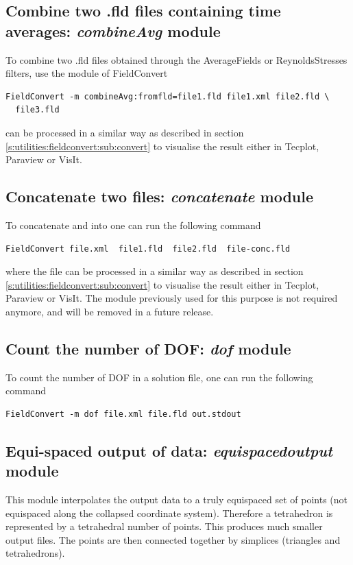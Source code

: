 \subsection{Combine two .fld files containing time averages: \textit{combineAvg} module}
To combine two .fld files obtained through the AverageFields or ReynoldsStresses filters,
use the  module of FieldConvert
%
\begin{lstlisting}[style=BashInputStyle]
  FieldConvert -m combineAvg:fromfld=file1.fld file1.xml file2.fld \
  file3.fld
\end{lstlisting}
%
 can be processed in a similar way as described
in section \ref{s:utilities:fieldconvert:sub:convert} to visualise
the result either in Tecplot, Paraview or VisIt.
%
%
%
\subsection{Concatenate two files: \textit{concatenate} module}
To concatenate  and  into 
one can run the following command
%
\begin{lstlisting}[style=BashInputStyle]
FieldConvert file.xml  file1.fld  file2.fld  file-conc.fld
\end{lstlisting}
%
where the file  can be processed in a similar
way as described in section \ref{s:utilities:fieldconvert:sub:convert}
to visualise the result either in Tecplot, Paraview or VisIt. The
\inltt{concatenate} module previously used for this purpose is not
required anymore, and will be removed in a future release.
%
%
%
\subsection{Count the number of DOF: \textit{dof} module}
To count the number of DOF in a solution file,
one can run the following command
%
\begin{lstlisting}[style=BashInputStyle]
FieldConvert -m dof file.xml file.fld out.stdout
\end{lstlisting}
%
%
%
\subsection{Equi-spaced output of data: \textit{equispacedoutput} module}
This module interpolates the output data to a truly equispaced set of
points (not equispaced along the collapsed coordinate
system). Therefore a tetrahedron is represented by a tetrahedral
number of points. This produces much smaller output files. The points
are then connected together by simplices (triangles and tetrahedrons).

